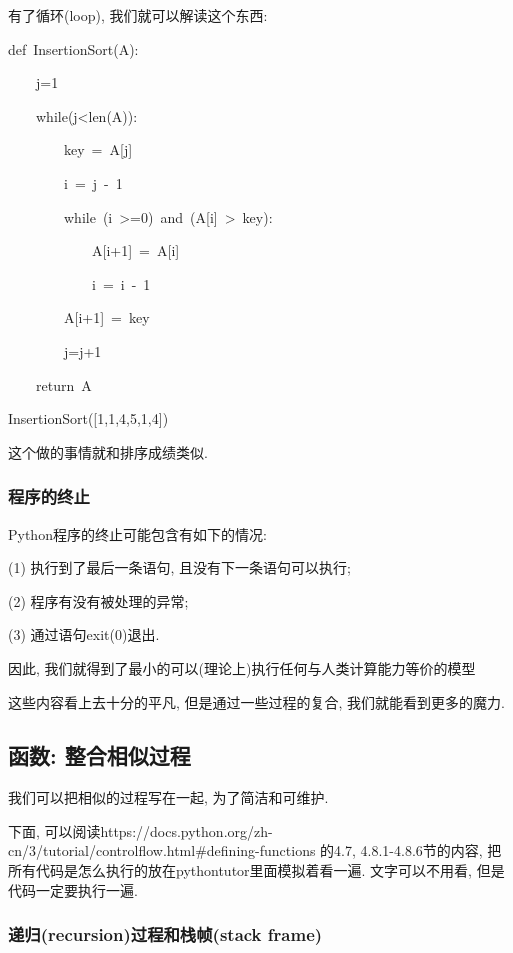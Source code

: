 有了循环(loop), 我们就可以解读这个东西:
\begin{lyxcode}
def~InsertionSort(A):

~~~~j=1

~~~~while(j<len(A)):

~~~~~~~~key~=~A{[}j{]}

~~~~~~~~i~=~j~-~1

~~~~~~~~while~(i~>=0)~and~(A{[}i{]}~>~key):

~~~~~~~~~~~~A{[}i+1{]}~=~A{[}i{]}

~~~~~~~~~~~~i~=~i~-~1

~~~~~~~~A{[}i+1{]}~=~key

~~~~~~~~j=j+1

~~~~return~A

InsertionSort({[}1,1,4,5,1,4{]})
\end{lyxcode}
这个做的事情就和排序成绩类似. 


\subsubsection{程序的终止}
\begin{definition}
Python程序的终止可能包含有如下的情况:

(1) 执行到了最后一条语句, 且没有下一条语句可以执行;

(2) 程序有没有被处理的异常;

(3) 通过语句exit(0)退出. 
\end{definition}
因此, 我们就得到了最小的可以(理论上)执行任何与人类计算能力等价的模型

这些内容看上去十分的平凡, 但是通过一些过程的复合, 我们就能看到更多的魔力.

\subsection{函数: 整合相似过程}

我们可以把相似的过程写在一起, 为了简洁和可维护.

下面, 可以阅读https://docs.python.org/zh-cn/3/tutorial/controlflow.html\#defining-functions
的4.7, 4.8.1-4.8.6节的内容, 把所有代码是怎么执行的放在pythontutor里面模拟着看一遍. 文字可以不用看,
但是代码一定要执行一遍. 

\subsubsection{递归(recursion)过程和栈帧(stack frame)}

